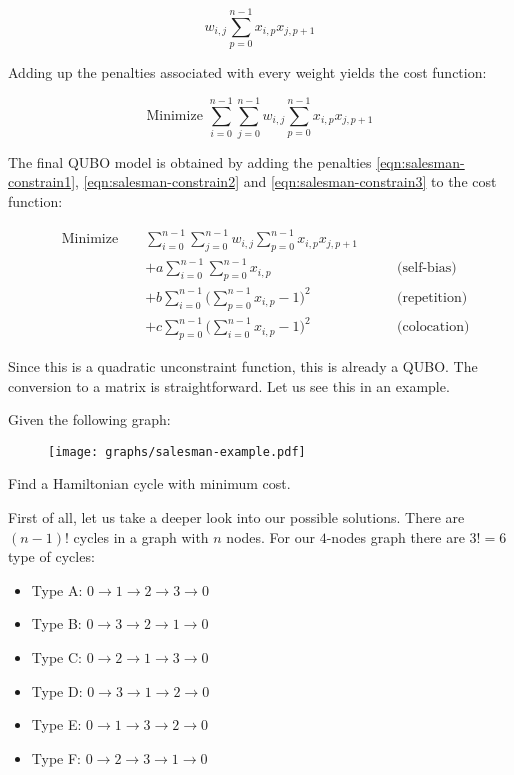 $$ w_{i,j} \sum_{p=0}^{n-1} x_{i,p}x_{j,p+1} $$

Adding up the penalties associated with every weight yields the cost function:

$$ \text{Minimize } \sum_{i=0}^{n-1} \sum_{j=0}^{n-1} w_{i,j}\sum_{p=0}^{n-1} x_{i,p}x_{j,p+1} $$

The final QUBO model is obtained by adding the penalties \ref{eqn:salesman-constrain1}, \ref{eqn:salesman-constrain2} and \ref{eqn:salesman-constrain3} to the cost function:

\begin{equation}
	\begin{alignedat}{3}
		& \text{Minimize }	&& \sum_{i=0}^{n-1} \sum_{j=0}^{n-1} w_{i,j}\sum_{p=0}^{n-1} x_{i,p}x_{j,p+1} & \\
		& && + a \sum_{i=0}^{n-1} \sum_{p=0}^{n-1} x_{i,p} & \qquad \text{(self-bias)} \\
		& && + b \sum_{i=0}^{n-1} \Big( \sum_{p=0}^{n-1} x_{i,p} - 1 \Big)^2 & \qquad \text{(repetition)} \\
		& && + c \sum_{p=0}^{n-1} \Big( \sum_{i=0}^{n-1} x_{i,p} - 1 \Big)^2 & \qquad \text{(colocation)}
	\end{alignedat}
	\label{eqn:salesman-cost-funct}
\end{equation}


Since this is a quadratic unconstraint function, this is already a QUBO. The conversion to a matrix is straightforward. Let us see this in an example.


\label{sec:salesman-example}


Given the following graph:

\begin{figure}[H]
	\texttt{[image: graphs/salesman-example.pdf]}
	\centering
	\label{fig:salesman-graph} %
\end{figure}

Find a Hamiltonian cycle with minimum cost. 

First of all, let us take a deeper look into our possible solutions. There are $(n-1)!$ cycles in a graph with $n$ nodes. For our $4$-nodes graph there are $3! = 6$ type of cycles:

\begin{itemize}
	\item Type A: $0 \rightarrow 1 \rightarrow 2 \rightarrow 3 \rightarrow 0$
	\item Type B: $0 \rightarrow 3 \rightarrow 2 \rightarrow 1 \rightarrow 0$
	\item Type C: $0 \rightarrow 2 \rightarrow 1 \rightarrow 3 \rightarrow 0$
	\item Type D: $0 \rightarrow 3 \rightarrow 1 \rightarrow 2 \rightarrow 0$
	\item Type E: $0 \rightarrow 1 \rightarrow 3 \rightarrow 2 \rightarrow 0$
	\item Type F: $0 \rightarrow 2 \rightarrow 3 \rightarrow 1 \rightarrow 0$
\end{itemize}

